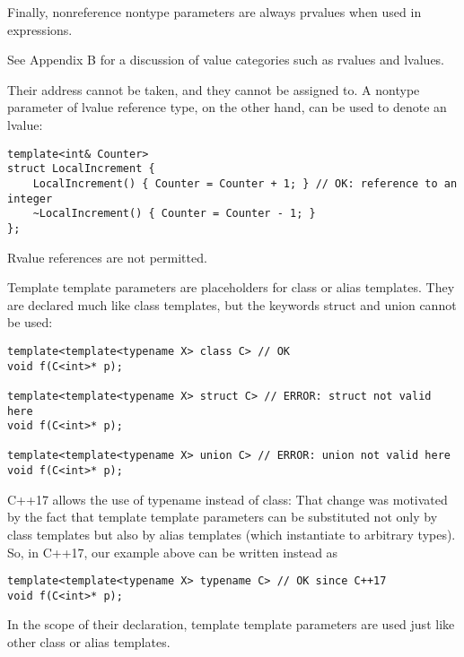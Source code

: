 Finally, nonreference nontype parameters are always prvalues when used in expressions. 

\begin{tcolorbox}[colback=webgreen!5!white,colframe=webgreen!75!black]
\hspace*{0.75cm}See Appendix B for a discussion of value categories such as rvalues and lvalues.
\end{tcolorbox}

Their address cannot be taken, and they cannot be assigned to. A nontype parameter of lvalue reference type, on the other hand, can be used to denote an lvalue:

\begin{lstlisting}[style=styleCXX]
template<int& Counter>
struct LocalIncrement {
	LocalIncrement() { Counter = Counter + 1; } // OK: reference to an integer
	~LocalIncrement() { Counter = Counter - 1; }
};
\end{lstlisting}

Rvalue references are not permitted.


Template template parameters are placeholders for class or alias templates. They are declared much like class templates, but the keywords struct and union cannot be used:

\begin{lstlisting}[style=styleCXX]
template<template<typename X> class C> // OK
void f(C<int>* p);

template<template<typename X> struct C> // ERROR: struct not valid here
void f(C<int>* p);

template<template<typename X> union C> // ERROR: union not valid here
void f(C<int>* p);
\end{lstlisting}

C++17 allows the use of typename instead of class: That change was motivated by the fact that template template parameters can be substituted not only by class templates but also by alias templates (which instantiate to arbitrary types). So, in C++17, our example above can be written instead as

\begin{lstlisting}[style=styleCXX]
template<template<typename X> typename C> // OK since C++17
void f(C<int>* p);
\end{lstlisting}

In the scope of their declaration, template template parameters are used just like other class or alias templates.

